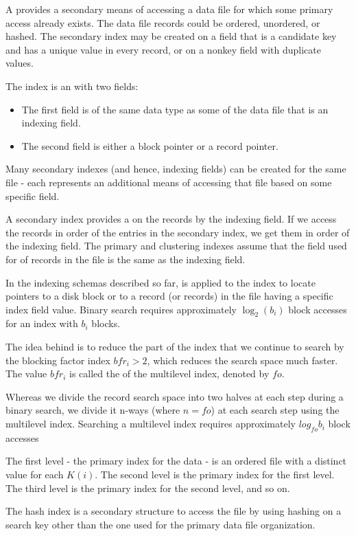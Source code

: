     \par A  provides a secondary means of accessing a data file for which some primary access already exists. The data file records could be ordered, unordered, or hashed. The secondary index may be created on a field that is a candidate key and has a unique value in every record, or on a nonkey field with duplicate values.
    \par The index is an  with two fields:
    \begin{itemize}
      \item The first field is of the same data type as some  of the data file that is an indexing field.
      \item The second field is either a block pointer or a record pointer.
    \end{itemize}
    \par Many secondary indexes (and hence, indexing fields) can be created for the same file - each represents an additional means of accessing that file based on some specific field.
    \par A secondary index provides a  on the records by the indexing field. If we access the records in order of the entries in the secondary index, we get them in order of the indexing field. The primary and clustering indexes assume that the field used for  of records in the file is the same as the indexing field.

  \par In the indexing schemas described so far,  is applied to the index to locate pointers to a disk block or to a record (or records) in the file having a specific index field value. Binary search requires approximately $\log_2(b_i)$ block accesses for an index with $b_i$ blocks.
  \par The idea behind  is to reduce the part of the index that we continue to search by the blocking factor index $bfr_i > 2$, which reduces the search space much faster. The value $bfr_i$ is called the  of the multilevel index, denoted by $fo$.
  \par Whereas we divide the record search space into two halves at each step during a binary search, we divide it n-ways (where $n = fo$) at each search step using the multilevel index. Searching a multilevel index requires approximately $log_{fo} b_i$ block accesses
  \par The first level - the primary index for the data - is an ordered file with a distinct value for each $K(i)$. The second level is the primary index for the first level. The third level is the primary index for the second level, and so on.


    \par The hash index is a secondary structure to access the file by using hashing on a search key other than the one used for the primary data file organization.


